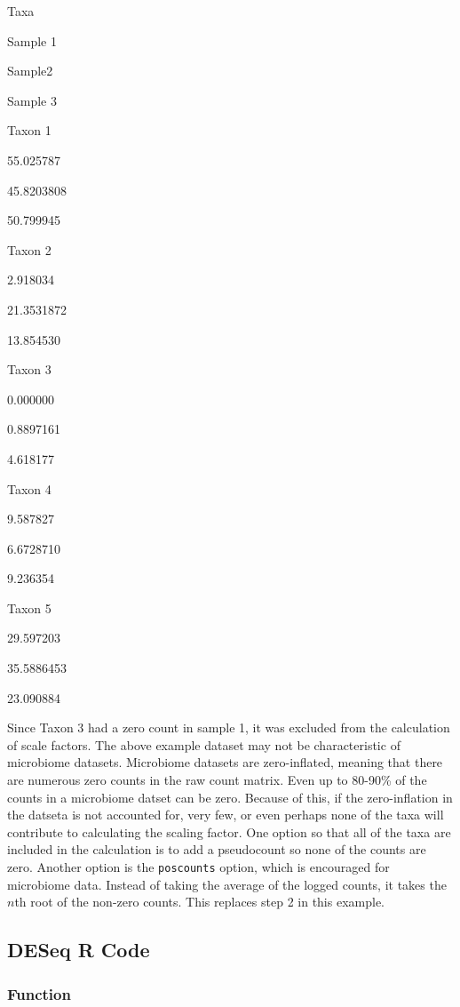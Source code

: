 \documentclass[
]{book}
\begin{document}
Taxa

Sample 1

Sample2

Sample 3

Taxon 1

55.025787

45.8203808

50.799945

Taxon 2

2.918034

21.3531872

13.854530

Taxon 3

0.000000

0.8897161

4.618177

Taxon 4

9.587827

6.6728710

9.236354

Taxon 5

29.597203

35.5886453

23.090884

Since Taxon 3 had a zero count in sample 1, it was excluded from the calculation of scale factors. The above example dataset may not be characteristic of microbiome datasets. Microbiome datasets are zero-inflated, meaning that there are numerous zero counts in the raw count matrix. Even up to 80-90\% of the counts in a microbiome datset can be zero. Because of this, if the zero-inflation in the datseta is not accounted for, very few, or even perhaps none of the taxa will contribute to calculating the scaling factor. One option so that all of the taxa are included in the calculation is to add a pseudocount so none of the counts are zero. Another option is the \texttt{poscounts} option, which is encouraged for microbiome data. Instead of taking the average of the logged counts, it takes the \(n\)th root of the non-zero counts. This replaces step 2 in this example.

\hypertarget{deseq-r-code}{%
\subsection{DESeq R Code}\label{deseq-r-code}}

\hypertarget{function-2}{%
\subsubsection{Function}\label{function-2}}
\end{document}
